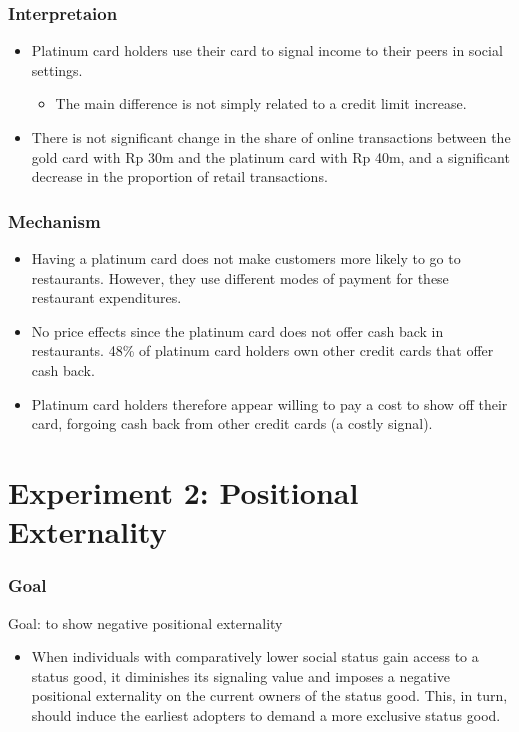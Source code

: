 \documentclass[unicode,12pt]{beamer}
\begin{document}
    \begin{frame}
        \frametitle{Interpretaion}
    
        \begin{itemize}
            \item Platinum card holders use their card to signal income to their peers in social settings.
            \begin{itemize}
                \item The main difference is not simply related to a credit limit increase. 
            \end{itemize}
            \item There is not significant change in the share of online transactions between the gold card with Rp 30m and the platinum card with Rp 40m, and a significant decrease in the proportion of retail transactions.
        \end{itemize}
    
    \end{frame}

    \begin{frame}
        \frametitle{Mechanism}
    
        \begin{itemize}
            \item Having a platinum card does not make customers more likely to go to restaurants. However, they use different modes of payment for these restaurant expenditures.
            \item No price effects since the platinum card does not offer cash back in restaurants. 48\% of platinum card holders own other credit cards that offer cash back.  
            \item Platinum card holders therefore appear willing to pay a cost to show off their card, forgoing cash back from other credit cards (a costly signal).
        \end{itemize}
        
    \end{frame}

    \section{Experiment 2: Positional Externality}

    \begin{frame}
        \frametitle{Goal}
    
        Goal: to show negative positional externality
        \begin{itemize}
            \item When individuals with comparatively lower social status gain access to a status good, it diminishes its signaling value and imposes a negative positional externality on the current owners of the status good. This, in turn, should induce the earliest adopters to demand a more exclusive status good.
        \end{itemize}
    
    \end{frame}
\end{document}
